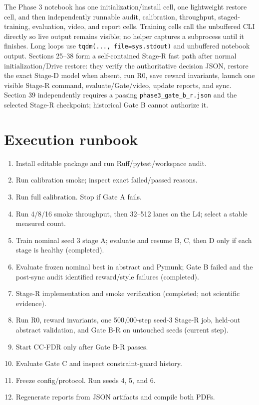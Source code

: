 \documentclass[12pt,twocolumn]{article}
\begin{document}
The Phase 3 notebook has one initialization/install cell, one lightweight restore cell, and then
independently runnable audit, calibration, throughput, staged-training, evaluation, video, and
report cells. Training cells call the unbuffered CLI directly so live output remains visible; no
helper captures a subprocess until it finishes. Long loops use
\texttt{tqdm(..., file=sys.stdout)} and unbuffered notebook output.
Sections 25--38 form a self-contained Stage-R fast path after normal initialization/Drive restore:
they verify the authoritative decision JSON, restore the exact Stage-D model when absent, run R0,
save reward invariants, launch one visible Stage-R command, evaluate/Gate/video, update reports,
and sync. Section 39 independently requires a passing \texttt{phase3\_gate\_b\_r.json} and the
selected Stage-R checkpoint; historical Gate B cannot authorize it.

\section{Execution runbook}
\begin{enumerate}
\item Install editable package and run Ruff/pytest/workspace audit.
\item Run calibration smoke; inspect exact failed/passed reasons.
\item Run full calibration. Stop if Gate A fails.
\item Run 4/8/16 smoke throughput, then 32--512 lanes on the L4; select a stable measured count.
\item Train nominal seed 3 stage A; evaluate and resume B, C, then D only if each stage is healthy
(completed).
\item Evaluate frozen nominal best in abstract and Pymunk; Gate B failed and the post-sync audit
identified reward/style failures (completed).
\item Stage-R implementation and smoke verification (completed; not scientific evidence).
\item Run R0, reward invariants, one 500,000-step seed-3 Stage-R job, held-out abstract
validation, and Gate B-R on untouched seeds (current step).
\item Start CC-FDR only after Gate B-R passes.
\item Evaluate Gate C and inspect constraint-guard history.
\item Freeze config/protocol. Run seeds 4, 5, and 6.
\item Regenerate reports from JSON artifacts and compile both PDFs.
\end{enumerate}
\end{document}

